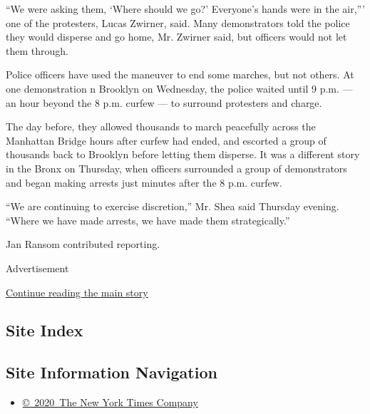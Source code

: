 ``We were asking them, `Where should we go?' Everyone's hands were in
the air,''' one of the protesters, Lucas Zwirner, said. Many
demonstrators told the police they would disperse and go home, Mr.
Zwirner said, but officers would not let them through.

Police officers have used the maneuver to end some marches, but not
others. At one demonstration n Brooklyn on Wednesday, the police waited
until 9 p.m. --- an hour beyond the 8 p.m. curfew --- to surround
protesters and charge.

The day before, they allowed thousands to march peacefully across the
Manhattan Bridge hours after curfew had ended, and escorted a group of
thousands back to Brooklyn before letting them disperse. It was a
different story in the Bronx on Thursday, when officers surrounded a
group of demonstrators and began making arrests just minutes after the 8
p.m. curfew.

``We are continuing to exercise discretion,'' Mr. Shea said Thursday
evening. ``Where we have made arrests, we have made them
strategically.''

Jan Ransom contributed reporting.

Advertisement

\protect\hyperlink{after-bottom}{Continue reading the main story}

\hypertarget{site-index}{%
\subsection{Site Index}\label{site-index}}

\hypertarget{site-information-navigation}{%
\subsection{Site Information
Navigation}\label{site-information-navigation}}

\begin{itemize}
\tightlist
\item
  \href{https://help.nytimes3xbfgragh.onion/hc/en-us/articles/115014792127-Copyright-notice}{©~2020~The
  New York Times Company}
\end{itemize}

